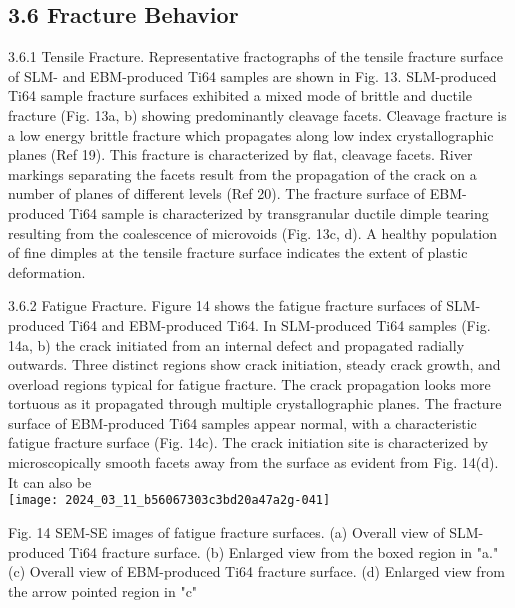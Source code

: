\documentclass[10pt]{article}
\begin{document}
\subsection*{3.6 Fracture Behavior}
3.6.1 Tensile Fracture. Representative fractographs of the tensile fracture surface of SLM- and EBM-produced Ti64 samples are shown in Fig. 13. SLM-produced Ti64 sample fracture surfaces exhibited a mixed mode of brittle and ductile fracture (Fig. 13a, b) showing predominantly cleavage facets. Cleavage fracture is a low energy brittle fracture which propagates along low index crystallographic planes (Ref 19). This fracture is characterized by flat, cleavage facets. River markings separating the facets result from the propagation of the crack on a number of planes of different levels (Ref 20). The fracture surface of EBM-produced Ti64 sample is characterized by transgranular ductile dimple tearing resulting from the coalescence of microvoids (Fig. 13c, d). A healthy population of fine dimples at the tensile fracture surface indicates the extent of plastic deformation.

3.6.2 Fatigue Fracture. Figure 14 shows the fatigue fracture surfaces of SLM-produced Ti64 and EBM-produced Ti64. In SLM-produced Ti64 samples (Fig. 14a, b) the crack initiated from an internal defect and propagated radially outwards. Three distinct regions show crack initiation, steady crack growth, and overload regions typical for fatigue fracture. The crack propagation looks more tortuous as it propagated through multiple crystallographic planes. The fracture surface of EBM-produced Ti64 samples appear normal, with a characteristic fatigue fracture surface (Fig. 14c). The crack initiation site is characterized by microscopically smooth facets away from the surface as evident from Fig. 14(d). It can also be\\
\texttt{[image: 2024\_03\_11\_b56067303c3bd20a47a2g-041]}

Fig. 14 SEM-SE images of fatigue fracture surfaces. (a) Overall view of SLM-produced Ti64 fracture surface. (b) Enlarged view from the boxed region in "a." (c) Overall view of EBM-produced Ti64 fracture surface. (d) Enlarged view from the arrow pointed region in "c"
\end{document}
